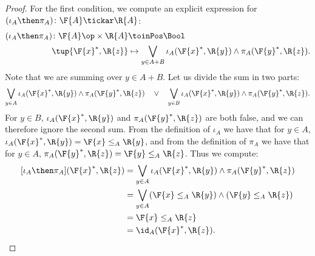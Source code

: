 \begin{proof}
    For the first condition, we compute  an explicit expression for $(\iota_A\then \pi_A) \colon \F{A} \tickar \R{A}$:
    \begin{equation}
    \begin{aligned}
        (\iota_A\then \pi_A) \colon  \F{A}\op\times \R{A} & \toinPos \Bool \\
                            \tup{\F{x}^*, \R{z}} &\mapsto
                            \bigvee_{y \in A + B} \iota_A(\F{x}^*,\R{y}) \wedge \pi_A(\F{y}^*,\R{z}).
    \end{aligned}
    \end{equation}
    Note that we are summing over $y \in A + B$. Let us divide the sum in two parts:
    \begin{equation}
    \bigvee_{y \in A} \iota_A(\F{x}^*,\R{y}) \wedge \pi_A(\F{y}^*,\R{z}) \quad\vee\quad
    \bigvee_{y \in B} \iota_A(\F{x}^*,\R{y}) \wedge \pi_A(\F{y}^*,\R{z}).
    \end{equation}
    For $y \in B$, $\iota_A(\F{x}^*,\R{y})$ and $\pi_A(\F{y}^*,\R{z})$ are both false, and we can therefore ignore the second sum.
    From the definition of $\iota_A$ we have that for $y\in A$, $ \iota_A(\F{x}^*,\R{y})=\F{x} \leq_A \R{y}$, and from the definition of $\pi_A$ we have that for $y\in A$, $\pi_A(\F{y}^*,\R{z})=\F{y} \leq_A \R{z}$. Thus we compute:
\begin{equation}
    \begin{aligned}
    [\iota_A\then \pi_A](\F{x}^*, \R{z}) &= \bigvee_{y \in A} \iota_A(\F{x}^*,\R{y}) \wedge \pi_A(\F{y}^*,\R{z})  \\
     &= \bigvee_{y \in A} (\F{x} \leq_A \R{y}) \wedge  (\F{y} \leq_A \R{z}) \\
     &= \F{x} \leq_A \R{z}\\
     &= \id_A(\F{x}^*, \R{z}).
\end{aligned}
\end{equation}
\end{proof}
